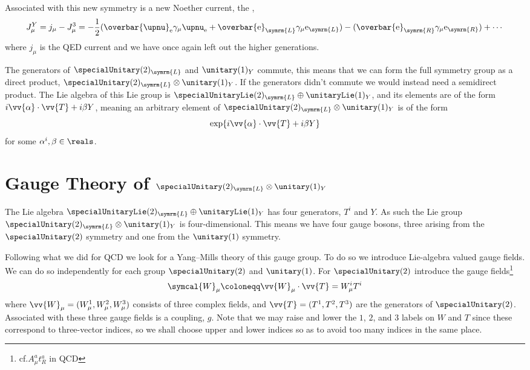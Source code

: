 \documentclass[fleqn]{NotesClass}
\newcommand{\Pparticle}[1]{\mathrm{#1}}
\newcommand{\Pex}{\ensuremath{\Pparticle{e}}}
\newcommand{\Pnu}{\ensuremath{\upnu}}
\newcommand{\Pnue}{\ensuremath{\upnu_{\mathrm{e}}}}
\newcommand{\diracadjoint}[1]{\overbar{#1}}
\newcommand{\Left}{\symrm{L}}
\newcommand{\Right}{\symrm{R}}
\newcommand{\gaugeW}{\symcal{W}}
\begin{document}
    Associated with this new symmetry is a new Noether current, the ,
    \begin{equation}
        J^Y_\mu = j_\mu - J^3_\mu = -\frac{1}{2}(\diracadjoint{\Pnu}_{\Pex} \gamma_\mu \Pnue + \diracadjoint{\Pex}_{\Left} \gamma_\mu \Pex_{\Left}) - (\diracadjoint{\Pex}_{\Right} \gamma_\mu \Pex_{\Right}) + \dotsb
    \end{equation}
    where \(j_\mu\) is the QED current and we have once again left out the higher generations.
    
    The generators of \(\specialUnitary(2)_{\Left}\) and \(\unitary(1)_Y\) commute, this means that we can form the full symmetry group as a direct product, \(\specialUnitary(2)_{\Left} \otimes \unitary(1)_{Y}\).
    If the generators didn't commute we would instead need a semidirect product.
    The Lie algebra of this Lie group is \(\specialUnitaryLie(2)_{\Left} \oplus \unitaryLie(1)_Y\), and its elements are of the form \(i \vv{\alpha} \cdot \vv{T} + i\beta Y\), meaning an arbitrary element of \(\specialUnitary(2)_{\Left} \otimes \unitary(1)_Y\) is of the form
    \begin{equation}
        \exp\{i\vv{\alpha} \cdot \vv{T} + i\beta Y\}
    \end{equation}
    for some \(\alpha^i, \beta \in \reals\).
    
    \section{Gauge Theory of \texorpdfstring{\(\specialUnitary(2)_{\Left} \otimes \unitary(1)_Y\)}{SU(2)L x U(1)Y}}
    The Lie algebra \(\specialUnitaryLie(2)_{\Left} \oplus \unitaryLie(1)_Y\) has four generators, \(T^i\) and \(Y\).
    As such the Lie group \(\specialUnitary(2)_{\Left} \otimes \unitary(1)_Y\) is four-dimensional.
    This means we have four gauge bosons, three arising from the \(\specialUnitary(2)\) symmetry and one from the \(\unitary(1)\) symmetry.
    
    Following what we did for QCD we look for a Yang--Mills theory of this gauge group.
    To do so we introduce Lie-algebra valued gauge fields.
    We can do so independently for each group \(\specialUnitary(2)\) and \(\unitary(1)\).
    For \(\specialUnitary(2)\) introduce the gauge fields\footnote{cf.\@ \(A^a_\mu t_R^a\) in QCD}
    \begin{equation}
        \gaugeW_\mu \coloneqq \vv{W}_\mu \cdot \vv{T} = W_\mu^i T^i
    \end{equation}
    where \(\vv{W}_\mu = (W^1_\mu, W^2_\mu, W^3_\mu)\) consists of three complex fields, and \(\vv{T} = (T^1, T^2, T^3)\) are the generators of \(\specialUnitary(2)\).
    Associated with these three gauge fields is a coupling, \(g\).
    Note that we may raise and lower the \(1\), \(2\), and \(3\) labels on \(W\) and \(T\) since these correspond to three-vector indices, so we shall choose upper and lower indices so as to avoid too many indices in the same place.
    
\end{document}
